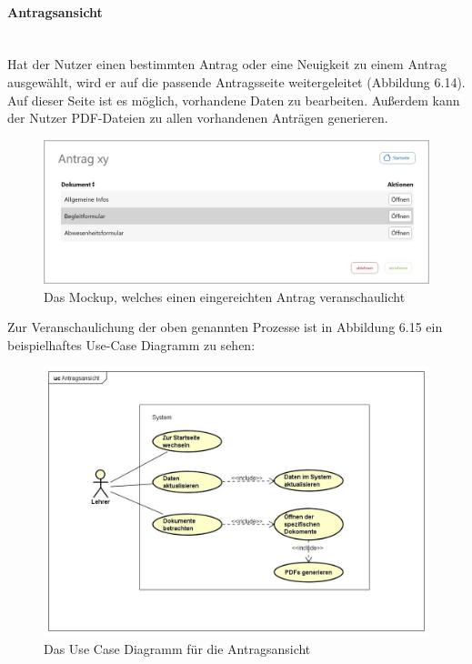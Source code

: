 \paragraph{Antragsansicht}
~\\
Hat der Nutzer einen bestimmten Antrag oder eine Neuigkeit zu einem Antrag ausgewählt, wird er auf die passende Antragsseite weitergeleitet (Abbildung 6.14). Auf dieser Seite ist es möglich, vorhandene Daten zu bearbeiten. Außerdem kann der Nutzer PDF-Dateien zu allen vorhandenen Anträgen generieren.
\begin{figure}[H]
	\centering
	\includegraphics[width=1\linewidth]{images/Mockup-Antragsansicht}
	\caption[Mockup Antragsansicht]{Das Mockup, welches einen eingereichten Antrag veranschaulicht}
	\label{fig:mockupAntrag}
\end{figure}
Zur Veranschaulichung der oben genannten Prozesse ist in Abbildung 6.15 ein beispielhaftes Use-Case Diagramm zu sehen: 
\begin{figure}[H]
	\centering
	\includegraphics[width=1\linewidth]{images/uc-antrag}
	\caption[Use Case Diagramm Antragsansicht]{Das Use Case Diagramm für die Antragsansicht}
	\label{fig:ucAntrag}
\end{figure}